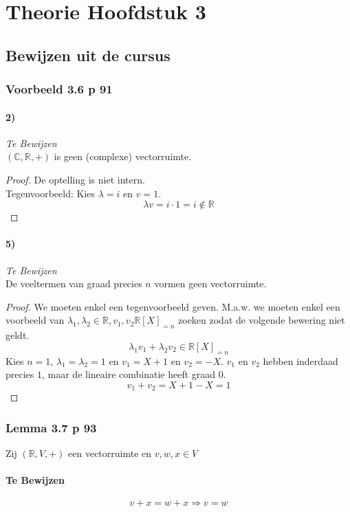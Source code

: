 \documentclass[lineaire_algebra_oplossingen.tex]{subfiles}
\begin{document}
\chapter{Theorie Hoofdstuk 3}
\section{Bewijzen uit de cursus}

\subsection{Voorbeeld 3.6 p 91}
\label{3.6}
\subsubsection*{2)}
\emph{Te Bewijzen}\\
$(\mathbb{C},\mathbb{R},+)$ is geen (complexe) vectorruimte.
\begin{proof}
De optelling is niet intern.\\
Tegenvoorbeeld: Kies $\lambda = i$ en $v = 1$.
\[
\lambda v = i \cdot 1 = i \not \in \mathbb{R}
\]
\end{proof}

\subsubsection*{5)}
\emph{Te Bewijzen}\\
De veeltermen van graad precies $n$ vormen geen vectorruimte.
\begin{proof}
We moeten enkel een tegenvoorbeeld geven. M.a.w. we moeten enkel een voorbeeld van $\lambda_1,\lambda_2 \in \mathbb{R}, v_1,v_2 \mathbb{R}[X]_{= n}$ zoeken zodat de volgende bewering niet geldt.
\[
\lambda_1v_1 + \lambda_2v_2 \in \mathbb{R}[X]_{= n}
\]
Kies $n=1$, $\lambda_1 = \lambda_2 = 1$ en $v_1 = X + 1$ en $v_2 = -X$. $v_1$ en $v_2$ hebben inderdaad precies $1$, maar de lineaire combinatie heeft graad $0$.
\[
v_1 + v_2 = X+1-X = 1
\]
\end{proof}


\subsection{Lemma 3.7 p 93}
\label{3.7}
Zij $(\mathbb{R},V,+)$ een vectorruimte en $v,w,x\in V$

\subsubsection*{Te Bewijzen}
\[
v+x = w+x \Rightarrow v=w
\]
\end{document}
